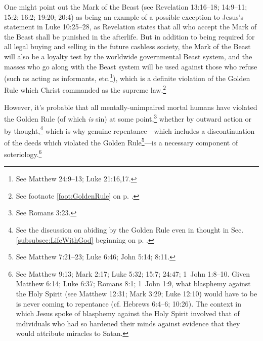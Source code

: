 \documentclass[letterpaper,12pt]{article}
\begin{document}
One might point out the Mark of the Beast (see Revelation 13:16--18; 14:9--11; 15:2; 16:2; 19:20; 20:4) as being an example of a possible exception to Jesus's statement in Luke 10:25--28, as Revelation states that all who accept the Mark of the Beast shall be punished in the afterlife. But in addition to being required for all legal buying and selling in the future cashless society, the Mark of the Beast will also be a loyalty test by the worldwide governmental Beast system, and the masses who go along with the Beast system will be used against those who refuse (such as acting as informants, etc.\footnote{See Matthew 24:9--13; Luke 21:16,17.}), which is a definite violation of the Golden Rule which Christ commanded as the supreme law.\footnote{See footnote \ref{foot:GoldenRule} on p. \pageref{foot:GoldenRule}.}

However, it's probable that all mentally-unimpaired mortal humans have violated the Golden Rule (of which \emph{is} sin) at some point,\footnote{See Romans 3:23.} whether by outward action or by thought,\footnote{See the discussion on abiding by the Golden Rule even in thought in Sec. \ref{subsubsec:LifeWithGod} beginning on p. \pageref{subsubsec:LifeWithGod}.} which is why genuine repentance---which includes a discontinuation of the deeds which violated the Golden Rule\footnote{See Matthew 7:21--23; Luke 6:46; John 5:14; 8:11.}---is a necessary component of soteriology.\footnote{See Matthew 9:13; Mark 2:17; Luke 5:32; 15:7; 24:47; 1~John 1:8--10. Given Matthew 6:14; Luke 6:37; Romans 8:1; 1~John 1:9, what blasphemy against the Holy Spirit (see Matthew 12:31; Mark 3:29; Luke 12:10) would have to be is never coming to repentance (cf. Hebrews 6:4--6; 10:26). The context in which Jesus spoke of blasphemy against the Holy Spirit involved that of individuals who had so hardened their minds against evidence that they would attribute miracles to Satan.}
\end{document}

